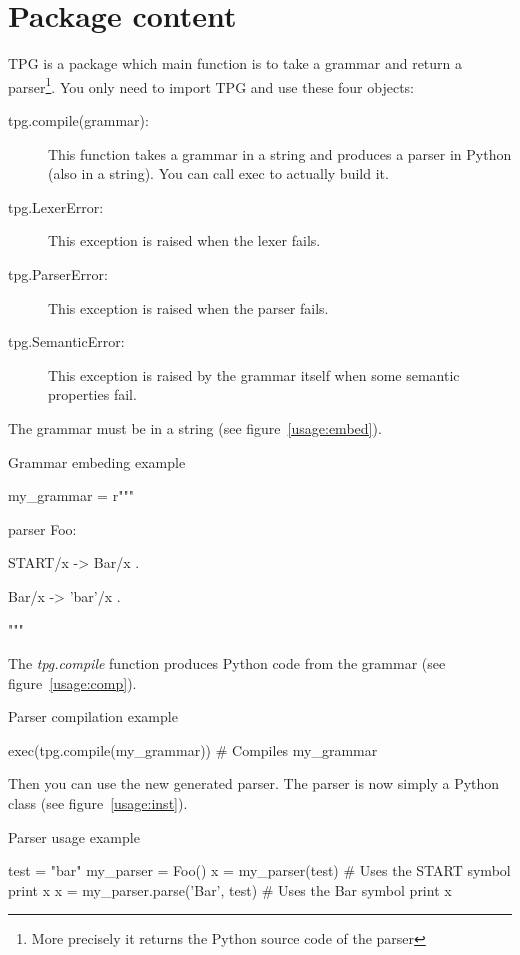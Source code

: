 \section{Package content}

TPG is a package which main function is to take a grammar and return a parser\footnote{More precisely it returns the Python source code of the parser}.
You only need to import TPG and use these four objects:

\begin{description}
	\item [tpg.compile(grammar):]
		This function takes a grammar in a string and produces
		a parser in Python (also in a string).
		You can call exec to actually build it. 
	\item [tpg.LexerError:]
		This exception is raised when the lexer fails.
	\item [tpg.ParserError:]
		This exception is raised when the parser fails.
	\item [tpg.SemanticError:]
		This exception is raised by the grammar itself
		when some semantic properties fail.
\end{description}

The grammar must be in a string (see figure~\ref{usage:embed}).

\begin{code}
\caption{Grammar embeding example}							\label{usage:embed}
\begin{verbatimtab}[4]
	my_grammar = r"""

	parser Foo:

		START/x -> Bar/x .

		Bar/x -> 'bar'/x .

	"""
\end{verbatimtab}
\end{code}

The \emph{tpg.compile} function produces Python code from the grammar (see figure~\ref{usage:comp}).

\begin{code}
\caption{Parser compilation example}						\label{usage:comp}
\begin{verbatimtab}[4]
	exec(tpg.compile(my_grammar))    # Compiles my_grammar
\end{verbatimtab}
\end{code}

Then you can use the new generated parser. The parser is now simply a Python class (see figure~\ref{usage:inst}).

\begin{code}
\caption{Parser usage example}								\label{usage:inst}
\begin{verbatimtab}[4]
	test = "bar"
	my_parser = Foo()
	x = my_parser(test)               # Uses the START symbol
	print x
	x = my_parser.parse('Bar', test)  # Uses the Bar symbol
	print x
\end{verbatimtab}
\end{code}

